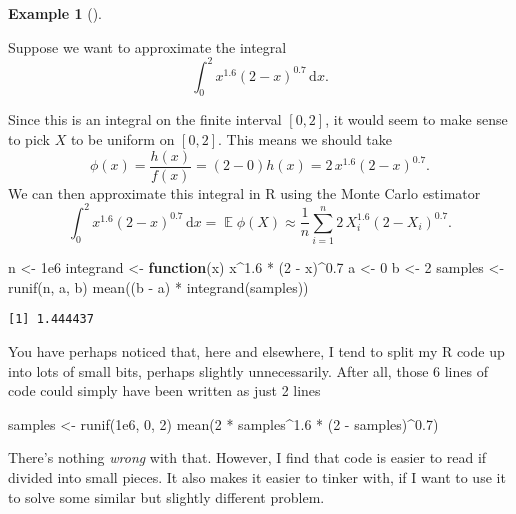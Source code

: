 \documentclass[
  letterpaper,
  DIV=11,
  numbers=noendperiod]{scrreprt}
\newenvironment{Shaded}{\begin{snugshade}}{\end{snugshade}}
\newcommand{\ControlFlowTok}[1]{\textcolor[rgb]{0.00,0.23,0.31}{\textbf{#1}}}
\newcommand{\DecValTok}[1]{\textcolor[rgb]{0.68,0.00,0.00}{#1}}
\newcommand{\FloatTok}[1]{\textcolor[rgb]{0.68,0.00,0.00}{#1}}
\newcommand{\FunctionTok}[1]{\textcolor[rgb]{0.28,0.35,0.67}{#1}}
\newcommand{\NormalTok}[1]{\textcolor[rgb]{0.00,0.23,0.31}{#1}}
\newcommand{\OtherTok}[1]{\textcolor[rgb]{0.00,0.23,0.31}{#1}}
\newcommand{\SpecialCharTok}[1]{\textcolor[rgb]{0.37,0.37,0.37}{#1}}
\theoremstyle{plain}
\theoremstyle{definition}
\theoremstyle{definition}
\newtheorem{example}{Example}[chapter]
\theoremstyle{remark}
\begin{document}
\begin{example}[]\protect\hypertarget{exm-MCint}{}\label{exm-MCint}

Suppose we want to approximate the integral
\[ \int_0^2 x^{1.6} (2-x)^{0.7} \, \mathrm{d}x . \]

Since this is an integral on the finite interval \([0,2]\), it would
seem to make sense to pick \(X\) to be uniform on \([0,2]\). This means
we should take
\[\phi(x) = \frac{h(x)}{f(x)} = (2-0)h(x) = 2\,x^{1.6}(2-x)^{0.7}.\] We
can then approximate this integral in R using the Monte Carlo estimator
\[ \int_0^2 x^{1.6} (2-x)^{0.7} \, \mathrm{d}x = \operatorname{\mathbb{E}} \phi(X) \approx \frac{1}{n} \sum_{i=1}^n 2\,X_i^{1.6} (2-X_i)^{0.7} . \]

\begin{Shaded}
\begin{Highlighting}[]
\NormalTok{n }\OtherTok{\textless{}{-}} \FloatTok{1e6}
\NormalTok{integrand }\OtherTok{\textless{}{-}} \ControlFlowTok{function}\NormalTok{(x) x}\SpecialCharTok{\^{}}\FloatTok{1.6} \SpecialCharTok{*}\NormalTok{ (}\DecValTok{2} \SpecialCharTok{{-}}\NormalTok{ x)}\SpecialCharTok{\^{}}\FloatTok{0.7}
\NormalTok{a }\OtherTok{\textless{}{-}} \DecValTok{0}
\NormalTok{b }\OtherTok{\textless{}{-}} \DecValTok{2}
\NormalTok{samples }\OtherTok{\textless{}{-}} \FunctionTok{runif}\NormalTok{(n, a, b)}
\FunctionTok{mean}\NormalTok{((b }\SpecialCharTok{{-}}\NormalTok{ a) }\SpecialCharTok{*} \FunctionTok{integrand}\NormalTok{(samples))}
\end{Highlighting}
\end{Shaded}

\begin{verbatim}
[1] 1.444437
\end{verbatim}

You have perhaps noticed that, here and elsewhere, I tend to split my R
code up into lots of small bits, perhaps slightly unnecessarily. After
all, those 6 lines of code could simply have been written as just 2
lines

\begin{Shaded}
\begin{Highlighting}[]
\NormalTok{samples }\OtherTok{\textless{}{-}} \FunctionTok{runif}\NormalTok{(}\FloatTok{1e6}\NormalTok{, }\DecValTok{0}\NormalTok{, }\DecValTok{2}\NormalTok{)}
\FunctionTok{mean}\NormalTok{(}\DecValTok{2} \SpecialCharTok{*}\NormalTok{ samples}\SpecialCharTok{\^{}}\FloatTok{1.6} \SpecialCharTok{*}\NormalTok{ (}\DecValTok{2} \SpecialCharTok{{-}}\NormalTok{ samples)}\SpecialCharTok{\^{}}\FloatTok{0.7}\NormalTok{)}
\end{Highlighting}
\end{Shaded}

There's nothing \emph{wrong} with that. However, I find that code is
easier to read if divided into small pieces. It also makes it easier to
tinker with, if I want to use it to solve some similar but slightly
different problem.

\end{example}
\end{document}
